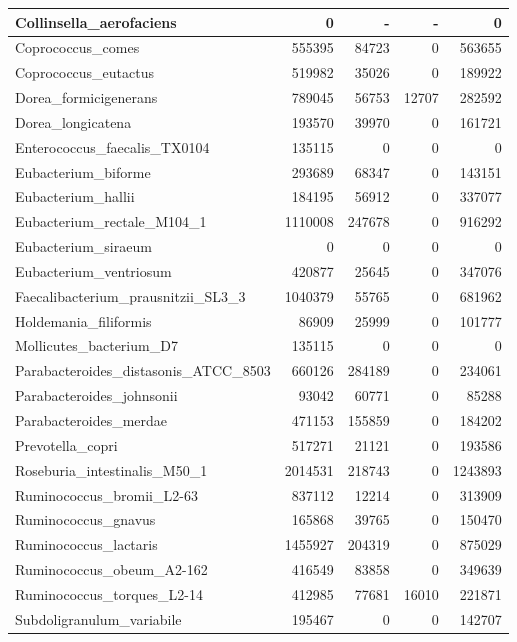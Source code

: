 \documentclass[12pt,a4paper]{article}
\begin{document}
\begin{table}[ht]
\begin{center}
\begin{tabular}{|l*{4}{|r}|}
Collinsella\_aerofaciens & 0 & - & - & 0 \\ \hline
Coprococcus\_comes & 555395 & 84723 & 0 & 563655 \\ \hline
Coprococcus\_eutactus & 519982 & 35026 & 0 & 189922 \\ \hline
Dorea\_formicigenerans & 789045 & 56753 & 12707 & 282592 \\ \hline
Dorea\_longicatena & 193570 & 39970 & 0 & 161721 \\ \hline
Enterococcus\_faecalis\_TX0104 & 135115 & 0 & 0 & 0 \\ \hline
Eubacterium\_biforme & 293689 & 68347 & 0 & 143151 \\ \hline
Eubacterium\_hallii & 184195 & 56912 & 0 & 337077 \\ \hline
Eubacterium\_rectale\_M104\_1 & 1110008 & 247678 & 0 & 916292 \\ \hline
Eubacterium\_siraeum & 0 & 0 & 0 & 0 \\ \hline
Eubacterium\_ventriosum & 420877 & 25645 & 0 & 347076 \\ \hline
Faecalibacterium\_prausnitzii\_SL3\_3 & 1040379 & 55765 & 0 & 681962 \\ \hline
Holdemania\_filiformis & 86909 & 25999 & 0 & 101777 \\ \hline
Mollicutes\_bacterium\_D7 & 135115 & 0 & 0 & 0 \\ \hline
Parabacteroides\_distasonis\_ATCC\_8503 & 660126 & 284189 & 0 & 234061 \\ \hline
Parabacteroides\_johnsonii & 93042 & 60771 & 0 & 85288 \\ \hline
Parabacteroides\_merdae & 471153 & 155859 & 0 & 184202 \\ \hline
Prevotella\_copri & 517271 & 21121 & 0 & 193586 \\ \hline
Roseburia\_intestinalis\_M50\_1 & 2014531 & 218743 & 0 & 1243893 \\ \hline
Ruminococcus\_bromii\_L2-63 & 837112 & 12214 & 0 & 313909 \\ \hline
Ruminococcus\_gnavus & 165868 & 39765 & 0 & 150470 \\ \hline
Ruminococcus\_lactaris & 1455927 & 204319 & 0 & 875029 \\ \hline
Ruminococcus\_obeum\_A2-162 & 416549 & 83858 & 0 & 349639 \\ \hline
Ruminococcus\_torques\_L2-14 & 412985 & 77681 & 16010 & 221871 \\ \hline
Subdoligranulum\_variabile & 195467 & 0 & 0 & 142707 \\ \hline
\end{tabular}
\end{center}
\end{table}
\end{document}
